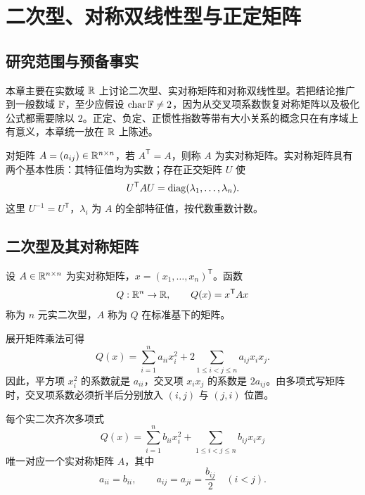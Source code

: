 %
%

\chapter{二次型、对称双线性型与正定矩阵}

\section{研究范围与预备事实}

本章主要在实数域 $\mathbb{R}$ 上讨论二次型、实对称矩阵和对称双线性型。若把结论推广到一般数域 $\mathbb{F}$，至少应假设 $\operatorname{char}\mathbb{F}\ne 2$，因为从交叉项系数恢复对称矩阵以及极化公式都需要除以 $2$。正定、负定、正惯性指数等带有大小关系的概念只在有序域上有意义，本章统一放在 $\mathbb{R}$ 上陈述。

对矩阵 $A=(a_{ij})\in\mathbb{R}^{n\times n}$，若 $A^{\mathsf T}=A$，则称 $A$ 为实对称矩阵。实对称矩阵具有两个基本性质：其特征值均为实数；存在正交矩阵 $U$ 使
\[
 U^{\mathsf T}AU=\operatorname{diag}(\lambda_1,\ldots,\lambda_n).
\]
这里 $U^{-1}=U^{\mathsf T}$，$\lambda_i$ 为 $A$ 的全部特征值，按代数重数计数。

\section{二次型及其对称矩阵}

\begin{definition}[二次型]
设 $A\in\mathbb{R}^{n\times n}$ 为实对称矩阵，$x=(x_1,\ldots,x_n)^{\mathsf T}$。函数
\[
 Q:\mathbb{R}^n\to\mathbb{R},\qquad Q(x)=x^{\mathsf T}Ax
\]
称为 $n$ 元实二次型，$A$ 称为 $Q$ 在标准基下的矩阵。
\end{definition}

展开矩阵乘法可得
\[
Q(x)=\sum_{i=1}^n a_{ii}x_i^2+2\sum_{1\le i<j\le n}a_{ij}x_ix_j.
\]
因此，平方项 $x_i^2$ 的系数就是 $a_{ii}$，交叉项 $x_ix_j$ 的系数是 $2a_{ij}$。由多项式写矩阵时，交叉项系数必须折半后分别放入 $(i,j)$ 与 $(j,i)$ 位置。

\begin{proposition}[二次齐次多项式与对称矩阵的一一对应]
每个实二次齐次多项式
\[
 Q(x)=\sum_{i=1}^n b_{ii}x_i^2+\sum_{1\le i<j\le n}b_{ij}x_ix_j
\]
唯一对应一个实对称矩阵 $A$，其中
\[
 a_{ii}=b_{ii},\qquad a_{ij}=a_{ji}=\frac{b_{ij}}2\quad(i<j).
\]
\end{proposition}

